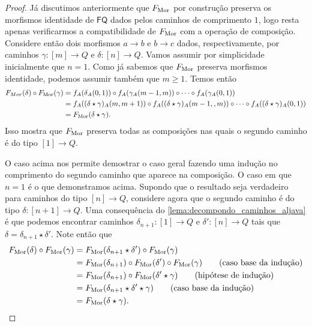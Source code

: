 \begin{proof}
    Já discutimos anteriormente que $F_{\mathrm{Mor}}$ por construção preserva os morfismos identidade de $\mathsf{FQ}$ dados pelos caminhos de comprimento $1$, logo resta apenas verificarmos a compatibilidade de $F_{\mathrm{Mor}}$ com a operação de composição.
    Considere então dois morfismos $a \to b$ e $b \to c$ dados, respectivamente, por caminhos $\gamma: [m] \to Q$ e $\delta: [n] \to Q$.
    Vamos assumir por simplicidade inicialmente que $n=1$.
    Como já sabemos que $F_{\mathrm{Mor}}$ preserva morfismos identidade, podemos assumir também que $m \geq 1$.
    Temos então
    \begin{align*}
        F_{Mor}(\delta) \circ F_{\mathrm{Mor}}(\gamma)
        & = f_A(\delta_A(0,1)) \circ f_A(\gamma_A(m-1,m)) \circ \dotsm \circ f_A(\gamma_A(0,1)) \\
        & = f_A((\delta \star \gamma)_A(m,m+1)) \circ f_A((\delta \star \gamma)_A(m-1,,m)) \circ \dotsm \circ f_A((\delta \star \gamma)_A(0,1)) \\
        & = F_{\mathrm{Mor}}(\delta \star \gamma).
    \end{align*}
    Isso mostra que $F_{\mathrm{Mor}}$ preserva todas as composições nas quais o segundo caminho é do tipo $[1] \to Q$.
    
    O caso acima nos permite demostrar o caso geral fazendo uma indução no comprimento do segundo caminho que aparece na composição.
    O caso em que $n=1$ é o que demonstramos acima.
    Supondo que o resultado seja verdadeiro para caminhos do tipo $[n] \to Q$, considere agora que o segundo caminho é do tipo $\delta: [n+1] \to Q$.
    Uma consequência do \cref{lema:decompondo_caminhos_aljava} é que podemos encontrar caminhos $\delta_{n+1}: [1] \to Q$ e $\delta': [n] \to Q$ tais que $\delta = \delta_{n+1} \star \delta'$.
    Note então que
    \begin{align*}
        F_{\mathrm{Mor}}(\delta) \circ F_{\mathrm{Mor}}(\gamma)
        & = F_{\mathrm{Mor}}(\delta_{n+1} \star \delta') \circ F_{\mathrm{Mor}}(\gamma) \\
        & = F_{\mathrm{Mor}}(\delta_{n+1}) \circ F_{\mathrm{Mor}}(\delta') \circ F_{\mathrm{Mor}}(\gamma)
        \tag{caso base da indução} \\
        & = F_{\mathrm{Mor}}(\delta_{n+1}) \circ F_{\mathrm{Mor}}(\delta' \star \gamma)
        \tag{hipótese de indução} \\
        & = F_{\mathrm{Mor}}(\delta_{n+1} \star \delta' \star \gamma)
        \tag{caso base da indução} \\
        & = F_{\mathrm{Mor}}(\delta \star \gamma).
    \end{align*}
\end{proof}
